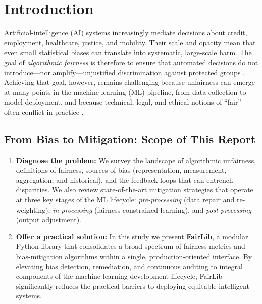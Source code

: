 \documentclass[12pt,a4paper,openright,twoside]{book}
\begin{document}
\tableofcontents   

\mainmatter

\chapter{Introduction}
\label{chap:introduction}
Artificial-intelligence (AI) systems increasingly mediate decisions about
credit, employment, healthcare, justice, and mobility.  Their scale and
opacity mean that even small statistical biases can translate into
systematic, large-scale harm.  The goal of \emph{algorithmic fairness} is
therefore to ensure that automated decisions do not introduce—nor
amplify—unjustified discrimination against protected groups
\cite{mehrabi2021survey}.  Achieving that goal, however, remains
challenging because unfairness can emerge at many points in the
machine-learning (ML) pipeline, from data collection to model
deployment, and because technical, legal, and ethical notions of
“fair” often conflict in practice \cite{suresh2021framework}.

\section{From Bias to Mitigation: Scope of This Report}
\begin{enumerate}
  \item \textbf{Diagnose the problem:}  
  We survey the landscape of algorithmic unfairness, definitions of
  fairness, sources of bias (representation, measurement, aggregation,
  and historical), and the feedback loops that can entrench disparities.
  We also review state-of-the-art mitigation strategies that operate at
  three key stages of the ML lifecycle:
  \emph{pre-processing} (data repair and re-weighting),
  \emph{in-processing} (fairness-constrained learning), and
  \emph{post-processing} (output adjustment).

  \item \textbf{Offer a practical solution:}  
In this study we present \textbf{FairLib}, a modular Python library that consolidates a broad spectrum of fairness metrics and bias-mitigation algorithms within a single, production-oriented interface. By elevating bias detection, remediation, and continuous auditing to integral components of the machine-learning development lifecycle, FairLib significantly reduces the practical barriers to deploying equitable intelligent systems.
\end{enumerate}
\end{document}
